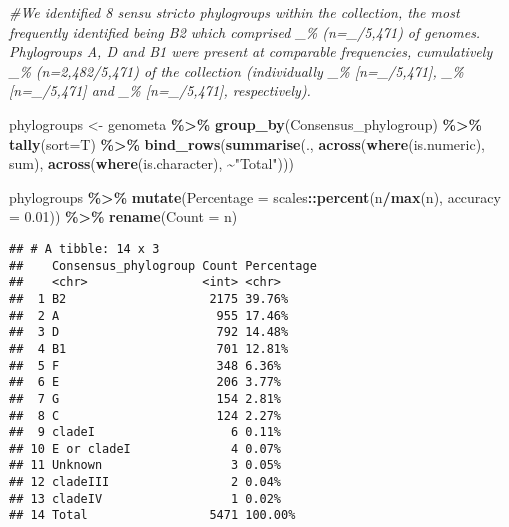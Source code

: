 \documentclass[
]{article}
\newenvironment{Shaded}{\begin{snugshade}}{\end{snugshade}}
\newcommand{\AttributeTok}[1]{\textcolor[rgb]{0.13,0.29,0.53}{#1}}
\newcommand{\CommentTok}[1]{\textcolor[rgb]{0.56,0.35,0.01}{\textit{#1}}}
\newcommand{\FloatTok}[1]{\textcolor[rgb]{0.00,0.00,0.81}{#1}}
\newcommand{\FunctionTok}[1]{\textcolor[rgb]{0.13,0.29,0.53}{\textbf{#1}}}
\newcommand{\NormalTok}[1]{#1}
\newcommand{\OtherTok}[1]{\textcolor[rgb]{0.56,0.35,0.01}{#1}}
\newcommand{\SpecialCharTok}[1]{\textcolor[rgb]{0.81,0.36,0.00}{\textbf{#1}}}
\newcommand{\StringTok}[1]{\textcolor[rgb]{0.31,0.60,0.02}{#1}}
\begin{document}
\begin{Shaded}
\begin{Highlighting}[]
\CommentTok{\#We identified 8 sensu stricto phylogroups within the collection, the most frequently identified being B2 which comprised \_\% (n=\_/5,471) of genomes. Phylogroups A, D and B1 were present at comparable frequencies, cumulatively \_\% (n=2,482/5,471) of the collection (individually \_\% [n=\_/5,471], \_\% [n=\_/5,471] and \_\% [n=\_/5,471], respectively). }

\NormalTok{phylogroups }\OtherTok{\textless{}{-}}\NormalTok{ genometa }\SpecialCharTok{\%\textgreater{}\%} \FunctionTok{group\_by}\NormalTok{(Consensus\_phylogroup) }\SpecialCharTok{\%\textgreater{}\%} \FunctionTok{tally}\NormalTok{(}\AttributeTok{sort=}\NormalTok{T)   }\SpecialCharTok{\%\textgreater{}\%} 
  \FunctionTok{bind\_rows}\NormalTok{(}\FunctionTok{summarise}\NormalTok{(.,}
                      \FunctionTok{across}\NormalTok{(}\FunctionTok{where}\NormalTok{(is.numeric), sum),}
                      \FunctionTok{across}\NormalTok{(}\FunctionTok{where}\NormalTok{(is.character), }\SpecialCharTok{\textasciitilde{}}\StringTok{"Total"}\NormalTok{)))}

\NormalTok{phylogroups }\SpecialCharTok{\%\textgreater{}\%} \FunctionTok{mutate}\NormalTok{(}\AttributeTok{Percentage =}\NormalTok{ scales}\SpecialCharTok{::}\FunctionTok{percent}\NormalTok{(n}\SpecialCharTok{/}\FunctionTok{max}\NormalTok{(n), }\AttributeTok{accuracy =} \FloatTok{0.01}\NormalTok{)) }\SpecialCharTok{\%\textgreater{}\%} \FunctionTok{rename}\NormalTok{(}\StringTok{\textquotesingle{}Count\textquotesingle{}} \OtherTok{=}\NormalTok{ n)}
\end{Highlighting}
\end{Shaded}

\begin{verbatim}
## # A tibble: 14 x 3
##    Consensus_phylogroup Count Percentage
##    <chr>                <int> <chr>     
##  1 B2                    2175 39.76%    
##  2 A                      955 17.46%    
##  3 D                      792 14.48%    
##  4 B1                     701 12.81%    
##  5 F                      348 6.36%     
##  6 E                      206 3.77%     
##  7 G                      154 2.81%     
##  8 C                      124 2.27%     
##  9 cladeI                   6 0.11%     
## 10 E or cladeI              4 0.07%     
## 11 Unknown                  3 0.05%     
## 12 cladeIII                 2 0.04%     
## 13 cladeIV                  1 0.02%     
## 14 Total                 5471 100.00%
\end{verbatim}
\end{document}
